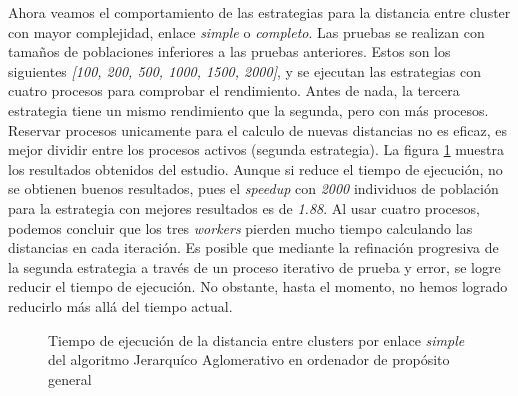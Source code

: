 		Ahora veamos el comportamiento de las estrategias para la distancia entre cluster con mayor complejidad, enlace \textit{simple} o \textit{completo}. Las pruebas se realizan con tamaños de poblaciones inferiores a las pruebas anteriores. Estos son los siguientes \textit{[100, 200, 500, 1000, 1500, 2000]}, y se ejecutan las estrategias con cuatro procesos para comprobar el rendimiento. Antes de nada, la tercera estrategia tiene un mismo rendimiento que la segunda, pero con más procesos. Reservar procesos unicamente para el calculo de nuevas distancias no es eficaz, es mejor dividir entre los procesos activos (segunda estrategia). La figura \ref{fig:JA_simple} muestra los resultados obtenidos del estudio. Aunque si reduce el tiempo de ejecución, no se obtienen buenos resultados, pues el \textit{speedup} con \textit{2000} individuos de población para la estrategia con mejores resultados es de \textit{1.88}. Al usar cuatro procesos, podemos concluir que los tres \textit{workers} pierden mucho tiempo calculando las distancias en cada iteración. Es posible que mediante la refinación progresiva de la segunda estrategia a través de un proceso iterativo de prueba y error, se logre reducir el tiempo de ejecución. No obstante, hasta el momento, no hemos logrado reducirlo más allá del tiempo actual.
		
			\begin{figure}[!h]
				\hspace{-0.10\textwidth}
				\caption{Tiempo de ejecución de la distancia entre clusters por enlace \textit{simple} del algoritmo Jerarquíco Aglomerativo en ordenador de propósito general}
				\label{fig:JA_simple}
			\end{figure}
				
